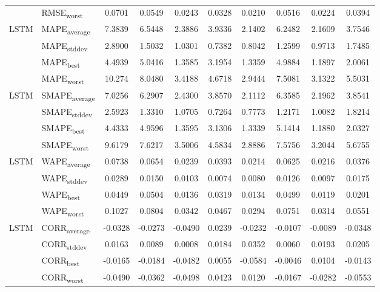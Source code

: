 {\begin{longtable}{l l c c c c c c c c}
 & RMSE\textsubscript{worst} & 0.0701 & 0.0549 & 0.0243 & 0.0328 & 0.0210 & 0.0516 & 0.0224 & 0.0394 \\
\cmidrule(lr){2-10}
\multirow{4}{*}{LSTM} & MAPE\textsubscript{average} & 7.3839 & 6.5448 & 2.3886 & 3.9336 & 2.1402 & 6.2482 & 2.1609 & 3.7546 \\
 & MAPE\textsubscript{stddev} & 2.8900 & 1.5032 & 1.0301 & 0.7382 & 0.8042 & 1.2599 & 0.9713 & 1.7485 \\
 & MAPE\textsubscript{best} & 4.4939 & 5.0416 & 1.3585 & 3.1954 & 1.3359 & 4.9884 & 1.1897 & 2.0061 \\
 & MAPE\textsubscript{worst} & 10.274 & 8.0480 & 3.4188 & 4.6718 & 2.9444 & 7.5081 & 3.1322 & 5.5031 \\
\cmidrule(lr){2-10}
\multirow{4}{*}{LSTM} & SMAPE\textsubscript{average} & 7.0256 & 6.2907 & 2.4300 & 3.8570 & 2.1112 & 6.3585 & 2.1962 & 3.8541 \\
 & SMAPE\textsubscript{stddev} & 2.5923 & 1.3310 & 1.0705 & 0.7264 & 0.7773 & 1.2171 & 1.0082 & 1.8214 \\
 & SMAPE\textsubscript{best} & 4.4333 & 4.9596 & 1.3595 & 3.1306 & 1.3339 & 5.1414 & 1.1880 & 2.0327 \\
 & SMAPE\textsubscript{worst} & 9.6179 & 7.6217 & 3.5006 & 4.5834 & 2.8886 & 7.5756 & 3.2044 & 5.6755 \\
\cmidrule(lr){2-10}
\multirow{4}{*}{LSTM} & WAPE\textsubscript{average} & 0.0738 & 0.0654 & 0.0239 & 0.0393 & 0.0214 & 0.0625 & 0.0216 & 0.0376 \\
 & WAPE\textsubscript{stddev} & 0.0289 & 0.0150 & 0.0103 & 0.0074 & 0.0080 & 0.0126 & 0.0097 & 0.0175 \\
 & WAPE\textsubscript{best} & 0.0449 & 0.0504 & 0.0136 & 0.0319 & 0.0134 & 0.0499 & 0.0119 & 0.0201 \\
 & WAPE\textsubscript{worst} & 0.1027 & 0.0804 & 0.0342 & 0.0467 & 0.0294 & 0.0751 & 0.0314 & 0.0551 \\
\cmidrule(lr){2-10}
\multirow{4}{*}{LSTM} & CORR\textsubscript{average} & -0.0328 & -0.0273 & -0.0490 & 0.0239 & -0.0232 & -0.0107 & -0.0089 & -0.0348 \\
 & CORR\textsubscript{stddev} & 0.0163 & 0.0089 & 0.0008 & 0.0184 & 0.0352 & 0.0060 & 0.0193 & 0.0205 \\
 & CORR\textsubscript{best} & -0.0165 & -0.0184 & -0.0482 & 0.0055 & -0.0584 & -0.0046 & 0.0104 & -0.0143 \\
 & CORR\textsubscript{worst} & -0.0490 & -0.0362 & -0.0498 & 0.0423 & 0.0120 & -0.0167 & -0.0282 & -0.0553 \\

\end{longtable}}

